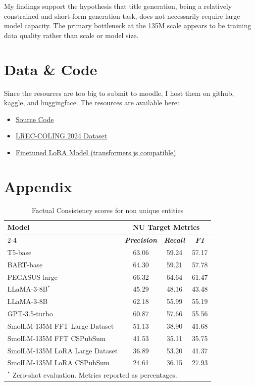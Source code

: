 \documentclass[12pt,conference]{IEEEtran}
\begin{document}
My findings support the hypothesis that title generation, being a relatively constrained and short-form generation task, does not necessarily require large model capacity. The primary bottleneck at the 135M scale appears to be training data quality rather than scale or model size.

\section{Data \& Code}
Since the resources are too big to submit to moodle, I host them on github, kaggle, and huggingface. The resources are available here: 
\begin{itemize}
    \item  \href{https://github.com/Throvn/aaml-project}{Source Code}
    \item \href{https://www.kaggle.com/datasets/throvn/lrec-coling-2024}{LREC-COLING 2024 Dataset}
    \item \href{https://huggingface.co/Throvn/abstract-title-generator}{Finetuned LoRA Model (transformers.js compatible)}
\end{itemize}

\section{Appendix}

\begin{table}[htbp]
\caption{Factual Consistency scores for non unique entities}
\begin{center}
\begin{tabular}{|l|c|c|c|}
\hline
\textbf{Model} & \multicolumn{3}{|c|}{\textbf{NU Target Metrics}} \\
\cline{2-4}
& \textbf{\textit{Precision}} 
& \textbf{\textit{Recall}} 
& \textbf{\textit{F1}} \\
\hline
T5-base                        & 63.06 & 59.24 & 57.17 \\
BART-base                      & 64.30 & 59.21 & 57.78 \\
PEGASUS-large                  & 66.32 & 64.64 & 61.47 \\
LLaMA-3-8B$^{*}$               & 45.29 & 48.16 & 43.48 \\
LLaMA-3-8B                     & 62.18 & 55.99 & 55.19 \\
GPT-3.5-turbo                  & 60.87 & 57.66 & 55.56 \\
SmolLM-135M FFT Large Dataset  & 51.13 & 38.90 & 41.68 \\
SmolLM-135M FFT CSPubSum       & 41.53 & 35.11 & 35.75 \\
SmolLM-135M LoRA Large Dataset & 36.89 & 53.20 & 41.37 \\
SmolLM-135M LoRA CSPubSum      & 24.61 & 36.15 & 27.93 \\
\hline
\multicolumn{4}{l}{$^{*}$ Zero-shot evaluation. Metrics reported as percentages.}
\end{tabular}
\label{tab:nu_metrics}
\end{center}
\end{table}
\end{document}
